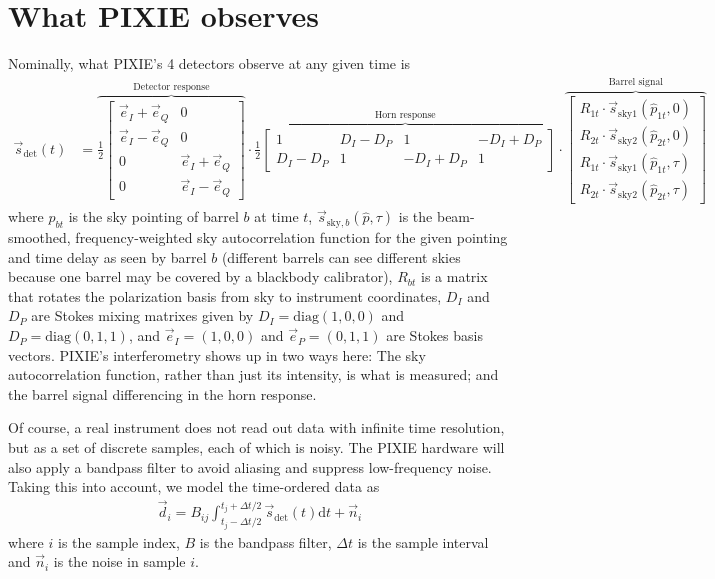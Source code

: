 \documentclass{article}
\begin{document}
\section{What PIXIE observes}
Nominally, what PIXIE's 4 detectors observe at any given time is
\begin{align}
\vec s_\textrm{det}(t) &= \overbrace{\frac12\begin{bmatrix}
	\vec e_I+\vec e_Q & 0 \\
	\vec e_I-\vec e_Q & 0 \\
	0 & \vec e_I+\vec e_Q  \\
	0 & \vec e_I-\vec e_Q \end{bmatrix}}^\textrm{Detector response}
	\cdot
	\overbrace{\frac12\begin{bmatrix}
	1 &  D_I-D_P & 1 & -D_I+D_P \\
	D_I-D_P	& 1 & -D_I+D_P & 1
	\end{bmatrix}}^\textrm{Horn response}
	\cdot
	\overbrace{\begin{bmatrix}
	R_{1t}\cdot\vec s_{\textrm{sky}1}(\hat p_{1t},0) \\
	R_{2t}\cdot\vec s_{\textrm{sky}2}(\hat p_{2t},0) \\
	R_{1t}\cdot\vec s_{\textrm{sky}1}(\hat p_{1t},\tau) \\
	R_{2t}\cdot\vec s_{\textrm{sky}2}(\hat p_{2t},\tau)
	\end{bmatrix}}^\textrm{Barrel signal}
	\label{eq:response}
\end{align}
where $\hat p_{bt}$ is the sky pointing of barrel $b$ at time $t$,
$\vec s_{\textrm{sky},b}(\hat p,\tau)$ is the beam-smoothed,
frequency-weighted sky autocorrelation
function for the given pointing and time delay as seen by barrel $b$
(different barrels can see different skies because one barrel may
be covered by a blackbody calibrator),
$R_{bt}$ is
a matrix that rotates the polarization basis from sky to instrument
coordinates, $D_I$ and $D_P$ are Stokes mixing matrixes given by
$D_I = \textrm{diag}(1,0,0)$ and $D_P = \textrm{diag}(0,1,1)$,
and $\vec e_I = (1,0,0)$ and $\vec e_P = (0,1,1)$ are Stokes basis
vectors. PIXIE's interferometry shows up in two ways here:
The sky autocorrelation function, rather than just its intensity,
is what is measured; and the barrel signal differencing in the horn
response.

Of course, a real instrument does not read out data with infinite
time resolution, but as a set of discrete samples, each of which is
noisy. The PIXIE hardware will also apply a bandpass filter to avoid
aliasing and suppress low-frequency noise. Taking this into account,
we model the time-ordered data as
\begin{align}
	\vec d_i = B_{ij} \int_{t_j-\Delta t/2}^{t_j+\Delta t/2} \vec s_\textrm{det}(t) \textrm{d}t + \vec n_i
\end{align}
where $i$ is the sample index, $B$ is the bandpass filter, $\Delta t$ is the sample
interval and $\vec n_i$ is the noise in sample $i$.
\end{document}
